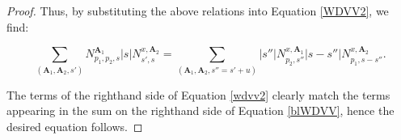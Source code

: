 \documentclass[12pt, oneside]{amsart}   	%
\newcommand{\NN}{\mathbb{N}}
\newcommand{\ZZ}{\mathbb{Z}}
\newcommand{\pt}{\operatorname{pt}}
\newcommand{\gp}{\operatorname{gp}}
\numberwithin{equation}{section}
\numberwithin{thm}{section}
\numberwithin{figure}{section}
\begin{document}
\begin{proof}
Thus, by substituting the above relations into Equation \ref{WDVV2}, we find:
 
 \begin{equation}\label{wdvv2}
 \sum_{(\textbf{A}_1, \textbf{A}_2,s')} N_{p_1,p_2,s}^{\textbf{A}_1}|s|N_{s',s}^{x,\textbf{A}_2} = \sum_{(\textbf{A}_1, \textbf{A}_2 ,s'' = s'+u)} |s''|N_{p_2,s''}^{x,\textbf{A}_1}|s-s''|N_{p_1,s-s''}^{x,\textbf{A}_2}.
 \end{equation}
 
 The terms of the righthand side of Equation \ref{wdvv2} clearly match the terms appearing in the sum on the righthand side of Equation \ref{blWDVV}, hence the desired equation follows.
 

 
% 
%
%
%
%
% 
 \end{proof}
 
\end{document}

